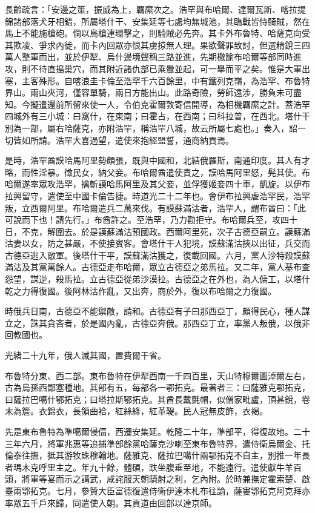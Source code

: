 \begin{pinyinscope}
長齡疏言：「安邊之策，振威為上，羈縻次之。浩罕與布哈爾、達爾瓦斯、喀拉提錦諸部落犬牙相錯，所屬塔什干、安集延等七處均無城池，其臨戰皆恃騎賊，然在馬上不能施槍砲。倘以鳥槍連環擊之，則騎賊必先奔。其卡外布魯特、哈薩克向受其欺凌、爭求內徙，而卡內回眾亦恨其虜掠無人理。果欲聲罪致討，但選精銳三四萬人整軍而出，並於伊犁、烏什邊境聲稱三路並進，先期檄諭布哈爾等部同時進攻，則不待直搗巢穴，而其附近諸仇部已乘釁並起，可一舉而平之矣。惟是大軍出塞，主客殊形。自喀浪圭卡倫至浩罕千六百餘里，中有鐵列克嶺，為浩罕、布魯特界山。兩山夾河，僅容單騎，兩日方能出山。此路奇險，勞師遠涉，勝負未可盡知。今擬遣還前所留來使一人，令伯克霍爾敦寄信開導，為相機羈縻之計。蓋浩罕四城外有三小城：曰窩什，在東南；曰霍占，在西南；曰科拉普，在西北。塔什干別為一部，屬右哈薩克，亦附浩罕，稱浩罕八城，故云所屬七處也。」奏入，詔一切皆如所請。浩罕大喜過望，遣使來抱經盟誓，通商納貢焉。

是時，浩罕酋謨哈馬阿里勢頗張，既與中國和，北結俄羅斯，南通印度。其人有才略，而性淫暴。徵民女，納父妾。布哈爾酋遣使責之，謨哈馬阿里怒，髡其使。布哈爾遂率眾攻浩罕，擒斬謨哈馬阿里及其父妾，並俘獲姬妾四十車，凱旋。以伊布拉興留守，遣使至中國卡倫告捷。時道光二十二年也。會伊布拉興虐浩罕民，浩罕叛，立西爾阿里。布哈爾遣兵二萬來伐。有謨蘇滿沽者，浩罕人，謂布酋曰：「此可說而下也！請先行。」布酋許之。至浩罕，乃力勸拒守。布哈爾兵至，攻四十日，不克，解圍去。於是謨蘇滿沽預國政。西爾阿里死，次子古德亞嗣立。謨蘇滿沽妻以女，防之甚嚴，不使接賓客。會塔什干人犯境，謨蘇滿沽挾以出征，兵交而古德亞逃入敵軍。後塔什干平，謨蘇滿沽獲之，復載回國。六月，黨人沙特殺謨蘇滿沽及其黨萬餘人。古德亞走布哈爾，眾立古德亞之弟馬拉。又二年，黨人基布查怨望，謀逆，殺馬拉。立古德亞從弟沙漠拉。古德亞之在外也，為人傭工，以塔什乾之力得復國。後阿林沽作亂，又出奔，商於外，復以布哈爾之力復國。

時俄兵日南，古德亞不能禦敵，請和。古德亞有子曰那西亞丁，頗得民心，種人謀立之，誅其貪吝者，於是國內亂，古德亞奔俄。那西亞丁立，率黨人叛俄，以俄非回教國也。

光緒二十九年，俄人滅其國，置費爾干省。

布魯特分東、西二部。東布魯特在伊犁西南一千四百里，天山特穆爾圖淖爾左右，古為烏孫西鄙塞種地。其部有五，每部各一鄂拓克。最著者三：曰薩雅克鄂拓克，曰薩拉巴噶什鄂拓克；曰塔拉斯鄂拓克。其酋長戴氈帽，似僧家毗盧，頂甚銳，卷末為簷。衣錦衣，長領曲袷，紅絲絳，紅革鞮。民人冠無皮飾，衣褐。

先是東布魯特為準噶爾侵偪，西遷安集延。乾隆二十年，準部平，得復故地。二十三年六月，將軍兆惠等追捕準部餘黨哈薩克沙喇至東布魯特界，遣侍衛烏爾金、托倫泰往撫，抵其游牧珠穆翰地。薩雅克、薩拉巴噶什兩鄂拓克不自主，別推一年長者瑪木克呼里主之。年九十餘，體碩，趺坐腹垂至地，不能遠行。遣使獻牛羊百頭，將軍等宴而示之講武，咸詫服天朝騎射之利，乞內附。於時兼撫定霍索楚、啟臺兩鄂拓克。七月，參贊大臣富德復遣侍衛伊達木札布往諭，薩婁鄂拓克阿克拜亦率眾五千戶來歸，同遣使入朝。其貢道由回部以達京師。


\end{pinyinscope}
